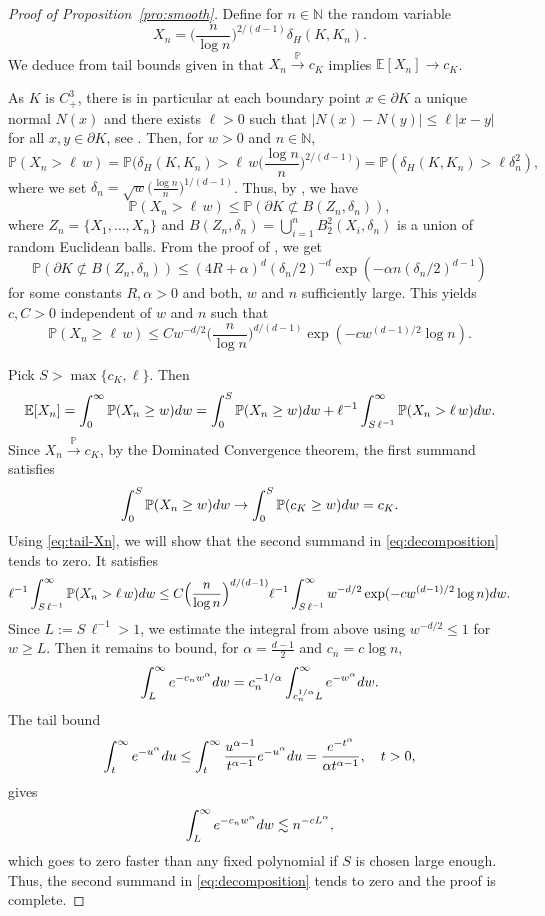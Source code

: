 \documentclass[a4paper,12pt]{article}
\theoremstyle{definition}
\newcommand{\IE}{\mathbb{E}}
\newcommand{\IN}{\mathbb{N}}
\newcommand{\IP}{\mathbb{P}}
\newcommand{\dd}{{\rm d}}
\begin{document}
\begin{proof}[Proof of Proposition~\ref{pro:smooth}]
Define for $n\in\IN$ the random variable 
\[
X_n=\Big(\frac{n}{\log n}\Big)^{2/(d-1)}\delta_H(K,K_n).
\]
We deduce from tail bounds given in \cite{DW96} that $X_n\xrightarrow{\IP} c_K$ implies $\IE[X_n] \to c_K$.

As $K$ is $C^3_+$, there is in particular at each boundary point $x \in \partial K$ a unique normal $N(x)$ and there exists $\ell>0$ such that 
$|N(x)-N(y)| \leq \ell |x-y|$ for all $x,y \in \partial K$, see \cite {DW96}.
Then, for $w>0$ and $n\in\IN$,
\[
\IP(X_n> \ell \, w )
=\IP\Big(\delta_H(K,K_n)> \ell \, w \Big(\frac{\log n}{n}\Big)^{2/(d-1)}\Big)
=\IP(\delta_H(K,K_n)> \ell \delta_n^2),
\]
where we set $\delta_n=\sqrt{w} \Big(\frac{\log n}{n}\Big)^{1/(d-1)}$.  Thus, by \cite[Thm. 1(b)]{DW96}, we have
\[
\IP(X_n> \ell \, w )
\le \IP(\partial K\not\subset B(Z_n,\delta_n)),
\]
where $Z_n=\{X_1,\dots,X_n\}$ and $B(Z_n,\delta_n)=\bigcup_{i=1}^n B_2^2(X_i,\delta_n)$ is a union of random Euclidean balls. From the proof of \cite[Lem. 1]{DW96}, we get
\[
\IP(\partial K\not\subset B(Z_n,\delta_n))
\le (4R+\alpha)^d (\delta_n/2)^{-d}\exp(-\alpha n (\delta_n/2)^{d-1})
\]
for some constants $R,\alpha>0$ and both,  $w$ and $n$ sufficiently large. This yields $c,C>0$ independent of $w$ and $n$ such that
\begin{equation} \label{eq:tail-Xn}
\IP(X_n\ge \ell \, w )
\le C w^{-d/2} \Big(\frac{n}{\log n}\Big)^{d/(d-1)} \exp(-c w^{(d-1)/2} \log n).
\end{equation}

Pick $S>\max\{c_K,\ell\}$. Then
\begin{equation} \label{eq:decomposition}
\IE [X_n]
=\int_0^{\infty} \IP(X_n\ge w) \dd w
=\int_0^{S} \IP(X_n\ge  w) \dd w
+\ell^{-1}\int_{S\, \ell^{-1}}^{\infty} \IP(X_n> \ell \, w ) \dd w.
\end{equation}
Since $X_n\xrightarrow{\IP} c_K$, by the Dominated Convergence theorem, the first summand satisfies
\[
\int_0^{S} \IP(X_n\ge  w) \dd w
\to \int_0^{S} \IP(c_K\ge  w) \dd w
=c_K.
\]
Using \eqref{eq:tail-Xn}, we will show that the second summand in \eqref{eq:decomposition} tends to zero. It satisfies
\[
\ell^{-1}\int_{S\, \ell^{-1}}^{\infty} \IP(X_n> \ell \, w) \dd w
\le C  \Big(\frac{n}{\log n}\Big)^{d/(d-1)} \ell^{-1}\int_{S\, \ell^{-1}}^{\infty} w^{-d/2} \exp(-c w^{(d-1)/2} \log n)  \dd w.
\]
Since $L:=S\, \ell^{-1}> 1$, we estimate the integral from above using $w^{-d/2}\le 1$ for $w\ge L$. Then it remains to bound, for $\alpha=\frac{d-1}{2}$ and $c_n=c\log n$,
\[
\int_{L}^{\infty} e^{-c_n w^\alpha }  \dd w
= c_n^{-1/\alpha} \int_{c_n^{1/\alpha}L}^{\infty} e^{-w^\alpha}  \dd w.
\]
The tail bound
\[
\int_t^{\infty} e^{-u^{\alpha}}\dd u 
\le \int_t^{\infty} \frac{u^{\alpha-1}}{t^{\alpha-1}}e^{-u^\alpha}\dd u 
= \frac{e^{-t^\alpha}}{\alpha t^{\alpha -1}},\quad t>0,
\]
gives
\[
\int_{L}^{\infty} e^{-c_n w^\alpha }  \dd w
\lesssim  n^{-cL^{\alpha}},
\]
which goes to zero faster than any fixed polynomial if $S$ is chosen large enough. Thus, the second summand in \eqref{eq:decomposition} tends to zero and the proof is complete.

\end{proof}
\end{document}
